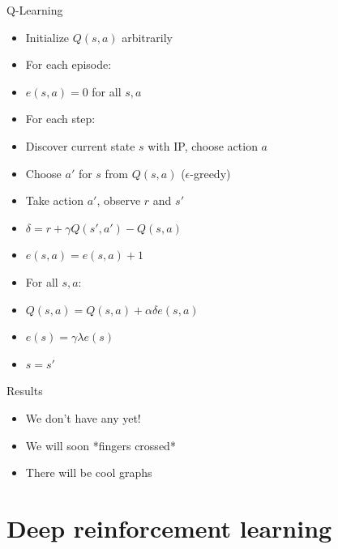 \documentclass{beamer}
\begin{document}
\begin{frame}{Q-Learning}
  \begin{itemize}
    \item[] Initialize $Q(s, a)$ arbitrarily
    \item[] For each episode:
    \item[] \hspace{2em} $e(s, a) = 0$ for all $s, a$
    \item[] \hspace{2em} For each step:
    \item[] \hspace{4em} Discover current state $s$ with IP, choose action $a$
    \item[] \hspace{4em} Choose $a'$ for $s$ from $Q(s, a)$ ($\epsilon$-greedy)
    \item[] \hspace{4em} Take action $a'$, observe $r$ and $s'$
    \item[] \hspace{4em} $\delta = r + \gamma Q(s', a') - Q(s, a)$
    \item[] \hspace{4em} $e(s, a) = e(s, a) + 1$
    \item[] \hspace{4em} For all $s, a$:
    \item[] \hspace{6em} $Q(s, a) = Q(s, a) + \alpha \delta e(s, a)$
    \item[] \hspace{6em} $e(s) = \gamma \lambda e(s)$
    \item[] \hspace{4em} $s = s'$
  \end{itemize}
\end{frame}

\begin{frame}{Results}
  \begin{itemize}
    \item We don't have any yet!
    \item We will soon *fingers crossed*
    \item There will be cool graphs
  \end{itemize}
\end{frame}

\section{Deep reinforcement learning}
\end{document}
